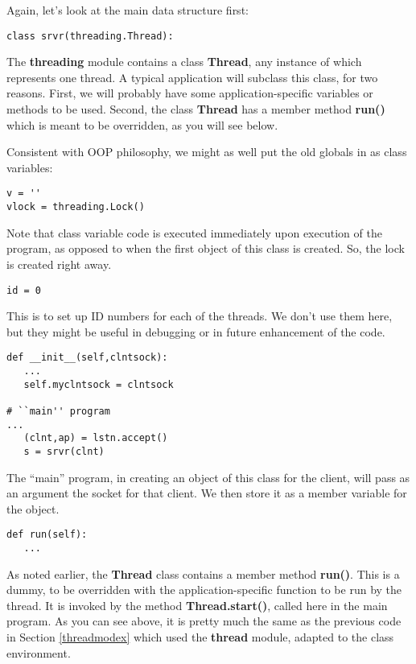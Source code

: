 Again, let's look at the main data structure first:

\begin{Verbatim}[fontsize=\relsize{-2}]
class srvr(threading.Thread):
\end{Verbatim}

The {\bf threading} module contains a class {\bf Thread}, any instance
of which represents one thread.  A typical application will subclass
this class, for two reasons.  First, we will probably have some
application-specific variables or methods to be used.  Second, the class
{\bf Thread} has a member method {\bf run()} which is meant to be
overridden, as you will see below.

Consistent with OOP philosophy, we might as well put the old globals in
as class variables:

\begin{Verbatim}[fontsize=\relsize{-2}]
v = ''
vlock = threading.Lock()
\end{Verbatim}

Note that class variable code is executed immediately upon execution of the
program, as opposed to when the first object of this class is created.
So, the lock is created right away.

\begin{Verbatim}[fontsize=\relsize{-2}]
id = 0
\end{Verbatim}

This is to set up ID numbers for each of the threads.  We don't use them
here, but they might be useful in debugging or in future enhancement of
the code.

\begin{Verbatim}[fontsize=\relsize{-2}]
def __init__(self,clntsock):
   ...
   self.myclntsock = clntsock

# ``main'' program
...
   (clnt,ap) = lstn.accept()
   s = srvr(clnt)
\end{Verbatim}

The ``main'' program, in creating an object of this class for the
client, will pass as an argument the socket for that client.  We then
store it as a member variable for the object.

\begin{Verbatim}[fontsize=\relsize{-2}]
def run(self):
   ...
\end{Verbatim}

As noted earlier, the {\bf Thread} class contains a member method {\bf
run()}.  This is a dummy, to be overridden with the application-specific
function to be run by the thread.  It is invoked by the method {\bf
Thread.start()}, called here in the main program.  As you can see above,
it is pretty much the same as the previous code in Section
\ref{threadmodex} which used the {\bf thread} module, adapted to the
class environment.

